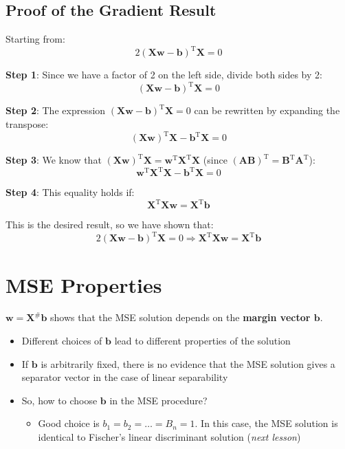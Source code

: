 \documentclass[11pt,a4paper]{article}
\theoremstyle{definition}
\theoremstyle{plain}
\theoremstyle{remark}
\begin{document}
\subsection{Proof of the Gradient Result}

Starting from:
\[
2(\mathbf{X}\mathbf{w} - \mathbf{b})^{\mathrm{T}} \mathbf{X} = 0
\]

\textbf{Step 1}: Since we have a factor of 2 on the left side, divide both sides by 2:
\[
(\mathbf{X}\mathbf{w} - \mathbf{b})^{\mathrm{T}} \mathbf{X} = 0
\]

\textbf{Step 2}: The expression $(\mathbf{X}\mathbf{w} - \mathbf{b})^{\mathrm{T}} \mathbf{X} = 0$ can be rewritten by expanding the transpose:
\[
(\mathbf{X}\mathbf{w})^{\mathrm{T}} \mathbf{X} - \mathbf{b}^{\mathrm{T}} \mathbf{X} = 0
\]

\textbf{Step 3}: We know that $(\mathbf{X}\mathbf{w})^{\mathrm{T}} \mathbf{X} = \mathbf{w}^{\mathrm{T}} \mathbf{X}^{\mathrm{T}} \mathbf{X}$ (since $(\mathbf{A}\mathbf{B})^{\mathrm{T}} = \mathbf{B}^{\mathrm{T}} \mathbf{A}^{\mathrm{T}}$):
\[
\mathbf{w}^{\mathrm{T}} \mathbf{X}^{\mathrm{T}} \mathbf{X} - \mathbf{b}^{\mathrm{T}} \mathbf{X} = 0
\]

\textbf{Step 4}: This equality holds if:
\[
\mathbf{X}^{\mathrm{T}} \mathbf{X} \mathbf{w} = \mathbf{X}^{\mathrm{T}} \mathbf{b}
\]

This is the desired result, so we have shown that:
\[
2(\mathbf{X}\mathbf{w} - \mathbf{b})^{\mathrm{T}} \mathbf{X} = 0 \Rightarrow \mathbf{X}^{\mathrm{T}} \mathbf{X} \mathbf{w} = \mathbf{X}^{\mathrm{T}} \mathbf{b}
\]

\section{MSE Properties}

\begin{tcolorbox}[colback=orange!5!white,colframe=orange!75!black,title=\textbf{Dependence on Margin Vector}]
$\mathbf{w} = \mathbf{X}^{\#} \mathbf{b}$ shows that the MSE solution depends on the \textbf{margin vector $\mathbf{b}$}.

\begin{itemize}
    \item Different choices of $\mathbf{b}$ lead to different properties of the solution
\end{itemize}
\end{tcolorbox}

\begin{itemize}
    \item If $\mathbf{b}$ is arbitrarily fixed, there is no evidence that the MSE solution gives a separator vector in the case of linear separability
    
    \item So, how to choose $\mathbf{b}$ in the MSE procedure?
    \begin{itemize}
        \item Good choice is $b_1 = b_2 = \ldots = B_n = 1$. In this case, the MSE solution is identical to Fischer's linear discriminant solution (\textit{next lesson})
    \end{itemize}
\end{itemize}
\end{document}
